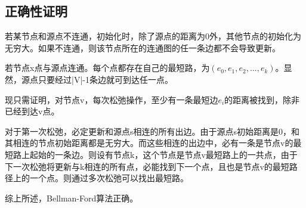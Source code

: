 \subsection{正确性证明}
若某节点和源点不连通，初始化时，除了源点的距离为0外，其他节点的初始化为无穷大。如果不连通，则该节点所在的连通图的任一条边都不会导致更新。

若节点x点与源点连通。每个点都存在自己的最短路，为$(e_0,e_1,e_2,...,e_k)$。显然，源点只要经过|V|-1条边就可到达任一点。

现只需证明，对节点v，每次松弛操作，至少有一条最短边$e_i$的距离被找到，除非已经到达v点。

对于第一次松弛，必定更新和源点s相连的所有出边。由于源点s初始距离是0，和其相连的节点初始距离都是无穷大。而这些相连的出边中，必有一条是节点v的最短路上起始的一条边。则设有节点k，这个节点是节点v最短路上的一共点，由于下一次松弛将更新与k相连的所有点，必能找到下一个点，且也是节点v的最短路径上的一个点。则通过多次松弛可以找出最短路。

综上所述，Bellman-Ford算法正确。
